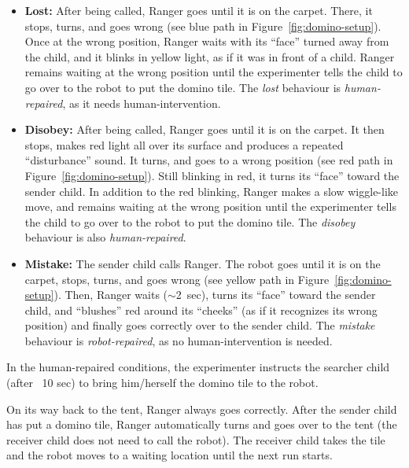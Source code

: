 \documentclass{sig-alternate}
\begin{document}
\begin{itemize}	

    \item \textbf{Lost:} After being called, Ranger goes until it is on the
    carpet. There, it stops, turns, and goes wrong (see blue path in
    Figure~\ref{fig:domino-setup}). Once at the wrong position, Ranger waits
    with its ``face'' turned away from the child, and it blinks in yellow light,
    as if it was in front of a child. Ranger remains waiting at the wrong
    position until the experimenter tells the child to go over to the robot to
    put the domino tile. The \textit{lost} behaviour is \textit{human-repaired},
    as it needs human-intervention.

    \item \textbf{Disobey:} After being called, Ranger goes until it is on the
    carpet. It then stops, makes red
    light all over its surface and produces a repeated ``disturbance'' sound. It
    turns, and goes to a wrong position (see red path in
    Figure~\ref{fig:domino-setup}). Still blinking in red, it turns its ``face''
    toward the sender child. In addition to the red blinking, Ranger
    makes a slow wiggle-like move, and remains waiting at the wrong position
    until the experimenter tells the child to go over to the robot to put the
    domino tile. The \textit{disobey} behaviour is also \textit{human-repaired}.

    \item \textbf{Mistake:} The sender child calls Ranger. The robot goes until
    it is on the carpet, stops, turns, and goes wrong (see yellow path in
    Figure~\ref{fig:domino-setup}). Then, Ranger waits ($\sim$2~sec), turns its
    ``face'' toward the sender child, and ``blushes'' red around its ``cheeks''
    (as if it recognizes its wrong position) and finally goes correctly over to
    the sender child. The \textit{mistake} behaviour is \textit{robot-repaired},
    as no human-intervention is needed.

\end{itemize}

In the human-repaired conditions, the experimenter instructs the searcher child
(after ~10 sec) to bring him/herself the domino tile to the robot.

On its way back to the tent, Ranger always goes correctly. After the sender
child has put a domino tile, Ranger automatically turns and goes over to the
tent (the receiver child does not need to call the robot). The receiver child
takes the tile and the robot moves to a waiting location until the next run
starts.
\end{document}

